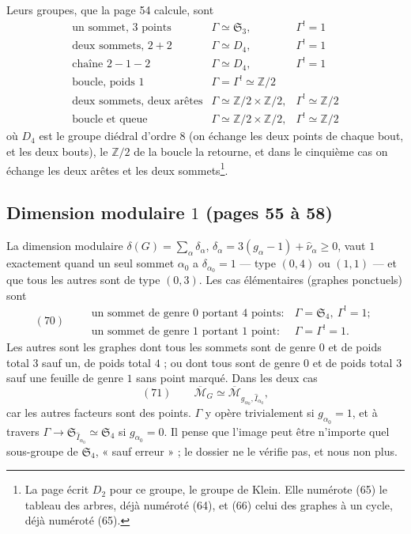 \documentclass[11pt,a4paper]{article}
\begin{document}
Leurs groupes, que la page 54 calcule, sont
\[
\begin{array}{lll}
\text{un sommet, } 3 \text{ points} & \Gamma \simeq \mathfrak{S}_3, &
\Gamma^{!} = 1 \\
\text{deux sommets, } 2 + 2 & \Gamma \simeq D_4, & \Gamma^{!} = 1 \\
\text{chaîne } 2 - 1 - 2 & \Gamma \simeq D_4, & \Gamma^{!} = 1 \\
\text{boucle, poids } 1 & \Gamma = \Gamma^{!} \simeq \mathbb{Z}/2 & \\
\text{deux sommets, deux arêtes} & \Gamma \simeq \mathbb{Z}/2 \times \mathbb{Z}/2, &
\Gamma^{!} \simeq \mathbb{Z}/2 \\
\text{boucle et queue} & \Gamma \simeq \mathbb{Z}/2 \times \mathbb{Z}/2, &
\Gamma^{!} \simeq \mathbb{Z}/2
\end{array}
\]
où $D_4$ est le groupe diédral d'ordre $8$ (on échange les deux points de chaque
bout, et les deux bouts), le $\mathbb{Z}/2$ de la boucle la retourne, et dans le
cinquième cas on échange les deux arêtes et les deux sommets\footnote{La page
écrit $D_2$ pour ce groupe, le groupe de Klein. Elle numérote (65) le tableau des
arbres, déjà numéroté (64), et (66) celui des graphes à un cycle, déjà numéroté
(65).}.

\subsection*{Dimension modulaire $1$ (pages 55 à 58)}

La dimension modulaire $\delta(G) = \sum_\alpha \delta_\alpha$, $\delta_\alpha =
3(g_\alpha - 1) + \widehat{\nu}_\alpha \geq 0$, vaut $1$ exactement quand un seul
sommet $\alpha_0$ a $\delta_{\alpha_0} = 1$ — type $(0, 4)$ ou $(1, 1)$ — et que
tous les autres sont de type $(0, 3)$. Les cas élémentaires (graphes ponctuels)
sont
\[
(70) \qquad
\begin{array}{ll}
\text{un sommet de genre } 0 \text{ portant } 4 \text{ points} : &
\Gamma = \mathfrak{S}_4,\ \Gamma^{!} = 1 ; \\
\text{un sommet de genre } 1 \text{ portant } 1 \text{ point} : &
\Gamma = \Gamma^{!} = 1 .
\end{array}
\]
Les autres sont les graphes dont tous les sommets sont de genre $0$ et de poids
total $3$ sauf un, de poids total $4$ ; ou dont tous sont de genre $0$ et de poids
total $3$ sauf une feuille de genre $1$ sans point marqué. Dans les deux cas
\[
(71) \qquad \overline{\mathcal{M}}_G \simeq \overline{\mathcal{M}}_{g_{\alpha_0},
\widehat{I}_{\alpha_0}},
\]
car les autres facteurs sont des points. $\Gamma$ y opère trivialement si
$g_{\alpha_0} = 1$, et à travers $\Gamma \to \mathfrak{S}_{\widehat{I}_{\alpha_0}}
\simeq \mathfrak{S}_4$ si $g_{\alpha_0} = 0$. Il pense que l'image peut être
n'importe quel sous-groupe de $\mathfrak{S}_4$, « sauf erreur » ; le dossier ne
le vérifie pas, et nous non plus.
\end{document}
